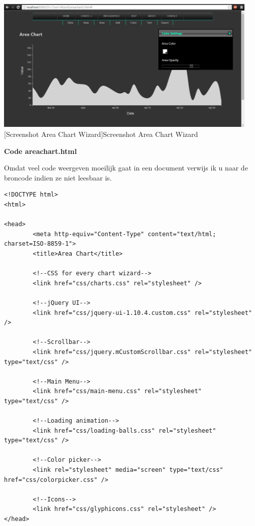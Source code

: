 \begin{center}
  \includegraphics[width=0.95\textwidth]{figures/chap2/areachart.png}
  [Screenshot Area Chart Wizard]{Screenshot Area Chart Wizard
\label{fig_areachart}}
\end{center}

\textbf{Code areachart.html}

Omdat veel code weergeven moeilijk gaat in een document verwijs ik u naar de broncode indien ze niet leesbaar is.
\begin{lstlisting}
<!DOCTYPE html>
<html>

<head>
        <meta http-equiv="Content-Type" content="text/html; charset=ISO-8859-1">
        <title>Area Chart</title>

        <!--CSS for every chart wizard-->
        <link href="css/charts.css" rel="stylesheet" />

        <!--jQuery UI-->
        <link href="css/jquery-ui-1.10.4.custom.css" rel="stylesheet" />

        <!--Scrollbar-->
        <link href="css/jquery.mCustomScrollbar.css" rel="stylesheet" type="text/css" />

        <!--Main Menu-->
        <link href="css/main-menu.css" rel="stylesheet" type="text/css" />

        <!--Loading animation-->
        <link href="css/loading-balls.css" rel="stylesheet" type="text/css" />

        <!--Color picker-->
        <link rel="stylesheet" media="screen" type="text/css" href="css/colorpicker.css" />

        <!--Icons-->
        <link href="css/glyphicons.css" rel="stylesheet" />
</head>
\end{lstlisting}

